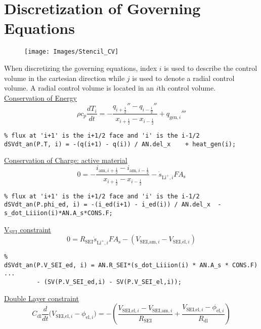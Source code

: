 \documentclass[12pt]{article}
\begin{document}
\section{Discretization of Governing Equations}
	\begin{figure} [h]
		\centering
		\texttt{[image: Images/Stencil\_CV]}
		\caption{}
		\label{fig:Stencil_CV}
	\end{figure}
	When discretizing the governing equations, index $i$ is used to describe the control volume in the cartesian direction while $j$ is used to denote a radial control volume. A radial control volume is located in an $i$th control volume.\\
	\underline{Conservation of Energy}
	\begin{equation}
		\rho c_p \frac{dT_i}{dt} = -\frac{q_{i+\frac{1}{2}}'' - q_{i-\frac{1}{2}}''}{x_{i+\frac{1}{2}} - x_{i-\frac{1}{2}}} + q_{\text{gen},i}'''
	\end{equation}
\fontsize{8}{12}\selectfont
\begin{lstlisting}
% flux at 'i+1' is the i+1/2 face and 'i' is the i-1/2
dSVdt_an(P.T, i) = -(q(i+1) - q(i)) / AN.del_x    + heat_gen(i); 
\end{lstlisting}
\fontsize{12}{12}\selectfont
\underline{	Conservation of Charge: active material}
	\begin{equation}
		0 = -\frac{i_{\text{am},{i+\frac{1}{2}}} -i_{\text{am},{i-\frac{1}{2}}} }{x_{i+\frac{1}{2}} - x_{i-\frac{1}{2}}} - \dot{s}_{\text{Li}^+,i}F A_\text{s}
	\end{equation}
\fontsize{8}{12}\selectfont
\begin{lstlisting}
% flux at 'i+1' is the i+1/2 face and 'i' is the i-1/2
dSVdt_an(P.phi_ed, i) = -(i_ed(i+1) - i_ed(i)) / AN.del_x  - s_dot_Liiion(i)*AN.A_s*CONS.F;
\end{lstlisting}
\fontsize{12}{12}\selectfont
\underline{	V$_\text{SEI}$ constraint}
	\begin{equation}
		0 = R_\text{SEI} \dot{s}_{\text{Li}^+,i}F A_\text{s} - (V_{\text{SEI,am},i} - V_{\text{SEI,el},i})
	\end{equation}
\fontsize{8}{12}\selectfont
\begin{lstlisting}
%
dSVdt_an(P.V_SEI_ed, i) = AN.R_SEI*(s_dot_Liiion(i) * AN.A_s * CONS.F)  ...
		 - (SV(P.V_SEI_ed,i) - SV(P.V_SEI_el,i));
\end{lstlisting}
\fontsize{12}{12}\selectfont
\underline{	Double Layer constraint}
	\begin{equation}
		C_\text{dl}\frac{d }{dt}\Big(V_{\text{SEI,el},i} - \phi_{\text{el},i}\Big) = -\left(\frac{V_{\text{SEI,el},i} - V_{\text{SEI,am},i}}{R_\text{SEI}} + \frac{V_{\text{SEI,el},i} - \phi_{\text{el},i}}{R_\text{dl}} \right)
	\end{equation}
\end{document}
